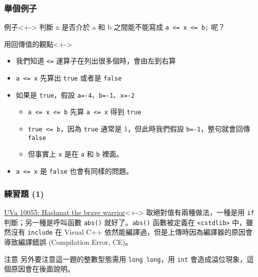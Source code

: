 \documentclass[utf8]{beamer}
\begin{document}
\begin{CJK}{UTF8}{bkai}
\begin{frame}[fragile]
  \frametitle{舉個例子}
  \begin{block}{例子}<+->
  判斷 x 是否介於 a 和 b 之間能不能寫成 \lstinline{a <= x <= b;}{} 呢？
  \end{block}
  \begin{exampleblock}{用回傳值的觀點}<+->
    \begin{itemize}
    \item 我們知道 \lstinline{<=}{} 運算子在列出很多個時，會\alert{由左到右算}
    \item<+-> \alert{\lstinline{a <= x}{}} 先算出 \lstinline{true}{} 或者是 \lstinline{false}{}
    \item<+-> 如果是 \lstinline{true}{}，假設 \lstinline{a=-4}{}、\lstinline{b=-1}{}、\lstinline{x=-2}{}
      \begin{itemize}[<+->]
      \item \lstinline{a <= x <= b}{} 先算 \lstinline{a <= x}{} 得到 \lstinline{true}{}
      \item \lstinline{true <= b}{}，因為 \lstinline{true}{} 通常是 1，但此時我們假設 \lstinline{b=-1}{}，整句就會回傳 \lstinline{false}{}
      \item 但事實上 \lstinline{x}{} 是在 \lstinline{a}{} 和 \lstinline{b}{} 裡面。
      \end{itemize}
    \item<+-> \lstinline{a <= x}{} 是 \lstinline{false}{} 也會有同樣的問題。
    \end{itemize}
  \end{exampleblock}
\end{frame}

\begin{frame}[fragile]
  \frametitle{練習題 (1)}
  \begin{exampleblock}{\href{http://unfortunate-dog.github.io/articles/100/p10055/}{UVa 10055: Hashmat the brave warrior}}<+->
  \label{uva:10055}
  取絕對值有兩種做法，一種是用 \lstinline{if}{} 判斷；另一種是呼叫函數 \lstinline{abs()}{} 就好了。\lstinline{abs()}{} 函數被定義在 \lstinline{<cstdlib>}{} 中，雖然沒有 \lstinline{include}{} 在 Visual C++ 依然能編譯過，但是上傳時因為編譯器的原因會導致\alert{編譯錯誤} (Compilation Error, CE)。
  \end{exampleblock}
  \begin{alertblock}{注意}
  另外要注意這一題的整數型態需用 \lstinline{long long}{}，用 \lstinline{int}{} 會造成溢位現象，這個原因會在後面說明。
  \end{alertblock}
\end{frame}


\end{CJK}
\end{document}
